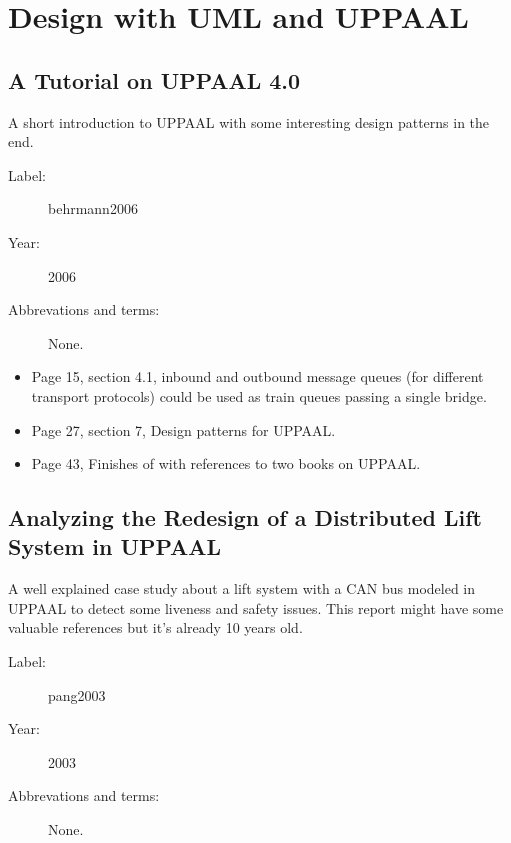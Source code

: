 \chapter{Design with UML and UPPAAL}

\section{A Tutorial on UPPAAL 4.0}

A short introduction to UPPAAL with some interesting design patterns in the
end.

\begin{description}
    \item[Label:] behrmann2006 \cite{behrmann2006}
    \item[Year:] 2006
    \item[Abbrevations and terms:] None.
\end{description}

\begin{itemize}
    \item Page 15, section 4.1, inbound and outbound message queues (for
        different transport protocols) could be used as train queues passing a
        single bridge.
    \item Page 27, section 7, Design patterns for UPPAAL.
    \item Page 43, Finishes of with references to two books on UPPAAL.
\end{itemize}

\section{Analyzing the Redesign of a Distributed Lift System in UPPAAL}

A well explained case study about a lift system with a CAN bus modeled in
UPPAAL to detect some liveness and safety issues. This report might have some
valuable references but it's already 10 years old.

\begin{description}
    \item[Label:] pang2003 \cite{pang2003}
    \item[Year:] 2003
    \item[Abbrevations and terms:] None.
\end{description}

